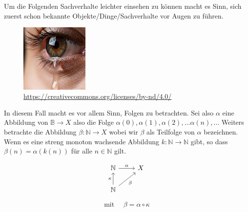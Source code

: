\chapter{}

Um die Folgenden Sachverhalte leichter einsehen zu können macht es Sinn,
sich zuerst schon bekannte Objekte/Dinge/Sachverhalte vor Augen zu führen.
\begin{figure}[h!]
 \centering
    \includegraphics[width=0.3\textwidth]{pictures/Auge.jpeg}
    \caption{\url{https://creativecommons.org/licenses/by-nd/4.0/}}
 \end{figure}

In diesem Fall macht es vor allem Sinn, Folgen zu betrachten.
Sei also $\alpha$ eine Abbildung von $\mathbb{B} \to X$ 
also die Folge $\alpha(0), \alpha(1), \alpha(2), \dots \alpha(n), \dots $
Weiters betrachte die Abbildung $\beta: \mathbb{N} \to X$
wobei wir $\beta$ als Teilfolge von $\alpha$ bezeichnen. Wenn es eine streng
monoton wachsende Abbildung $k: \mathbb{N} \to \mathbb{N}$ gibt, so dass
$\beta(n) = \alpha(k(n))$ für alle $n \in \mathbb{N}$ gilt.

$$
\begin{tikzcd}
\mathbb{N} \arrow[r, "\alpha"]  & X \\
\mathbb{N} \arrow[ur, "\beta"'] \arrow["\kappa", u] &
\end{tikzcd}
$$

$$
\text{mit } \quad \beta = \alpha \circ \kappa
$$

